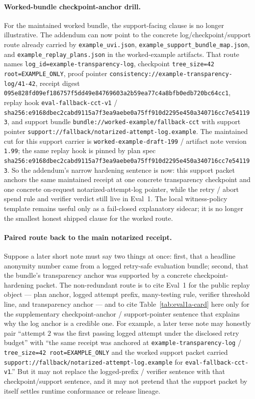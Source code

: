 \documentclass[11pt]{article}
\begin{document}
\paragraph{Worked-bundle checkpoint-anchor drill.}
For the maintained worked bundle, the support-facing clause is no longer illustrative.
The addendum can now point to the concrete log/checkpoint/support route already carried by
\nolinkurl{example_uvi.json},
\nolinkurl{example_support_bundle_map.json}, and
\nolinkurl{example_replay_plans.json} in the worked-example artifacts.
That route names
\texttt{log\_id=example-transparency-log},
checkpoint \nolinkurl{tree_size=42 root=EXAMPLE_ONLY},
proof pointer \texttt{consistency://example-transparency-log/41-42},
receipt digest \texttt{095e828fd09ef186757f5dd49e84769603a2b59ea77c4a8bfb0edb720bc64cc1},
replay hook \texttt{eval-fallback-cct-v1} / \texttt{sha256:e9168dbec2cabd9115a7f3ea9aebe0a75ff910d2295e450a340716cc7e541193},
and support bundle \texttt{bundle://worked-example/fallback-cct} with support pointer \texttt{support://fallback/notarized-attempt-log.example}.
The maintained cut for this support carrier is \nolinkurl{worked-example-draft-199} / artifact note version \nolinkurl{1.99}; the same replay hook is pinned by plan spec \nolinkurl{sha256:e9168dbec2cabd9115a7f3ea9aebe0a75ff910d2295e450a340716cc7e541193}.
So the addendum's narrow hardening sentence is now: this support packet anchors the same maintained receipt at one concrete transparency checkpoint and one concrete on-request notarized-attempt-log pointer, while the retry / abort spend rule and verifier verdict still live in Eval~1.
The local witness-policy template remains useful only as a fail-closed explanatory sidecar; it is no longer the smallest honest shipped clause for the worked route.

\paragraph{Paired route back to the main notarized receipt.}
Suppose a later short note must say two things at once: first, that a headline anonymity number came from a logged retry-safe evaluation bundle; second, that the bundle's transparency anchor was supported by a concrete checkpoint-hardening packet.
The non-redundant route is to cite Eval~1 for the public replay object --- plan anchor, logged attempt prefix, many-testing rule, verifier threshold line, and transparency anchor --- and to cite Table~\ref{tab:eval1a-card} here only for the supplementary checkpoint-anchor / support-pointer sentence that explains why the log anchor is a credible one.
For example, a later terse note may honestly pair ``attempt $2$ was the first passing logged attempt under the disclosed retry budget'' with ``the same receipt was anchored at \texttt{example-transparency-log} / \texttt{tree\_size=42 root=EXAMPLE\_ONLY} and the worked support packet carried \texttt{support://fallback/notarized-attempt-log.example} for \texttt{eval-fallback-cct-v1}.''
But it may not replace the logged-prefix / verifier sentence with that checkpoint/support sentence, and it may not pretend that the support packet by itself settles runtime conformance or release lineage.
\end{document}
